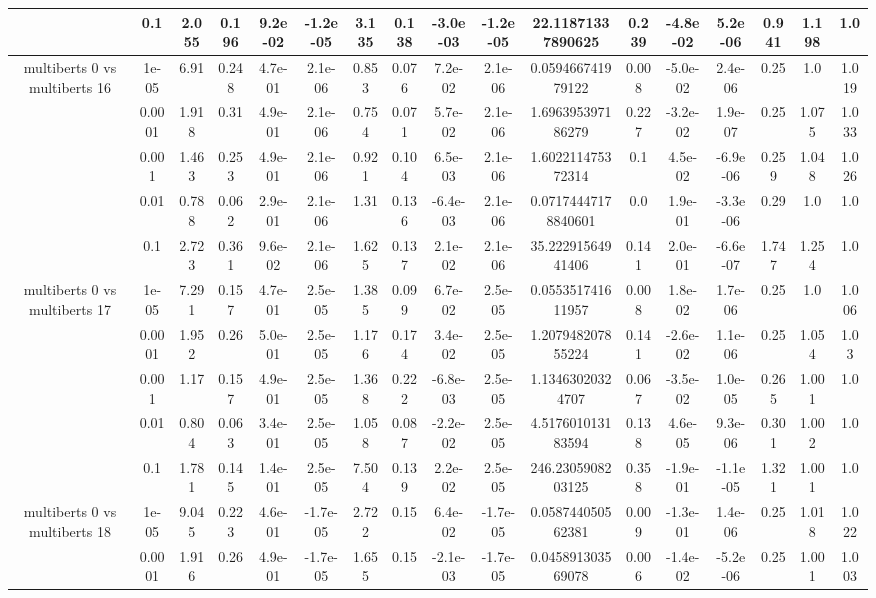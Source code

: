 \begin{tabular}{|c|c|c|c|c|c|c|c|c|c|c|c|c|c|c|c|c|}
 & 0.1 & 2.055 & 0.196 & 9.2e-02 & -1.2e-05 & 3.135 & 0.138 & -3.0e-03 & -1.2e-05 & 22.11871337890625 & 0.239 & -4.8e-02 & 5.2e-06 & 0.941 & 1.198 & 1.0 \\
\hline
\multirow{5}{*}{multiberts 0 vs multiberts 16} & 1e-05 & 6.91 & 0.248 & 4.7e-01 & 2.1e-06 & 0.853 & 0.076 & 7.2e-02 & 2.1e-06 & 0.059466741979122 & 0.008 & -5.0e-02 & 2.4e-06 & 0.25 & 1.0 & 1.019 \\
 & 0.0001 & 1.918 & 0.31 & 4.9e-01 & 2.1e-06 & 0.754 & 0.071 & 5.7e-02 & 2.1e-06 & 1.696395397186279 & 0.227 & -3.2e-02 & 1.9e-07 & 0.25 & 1.075 & 1.033 \\
 & 0.001 & 1.463 & 0.253 & 4.9e-01 & 2.1e-06 & 0.921 & 0.104 & 6.5e-03 & 2.1e-06 & 1.602211475372314 & 0.1 & 4.5e-02 & -6.9e-06 & 0.259 & 1.048 & 1.026 \\
 & 0.01 & 0.788 & 0.062 & 2.9e-01 & 2.1e-06 & 1.31 & 0.136 & -6.4e-03 & 2.1e-06 & 0.07174447178840601 & 0.0 & 1.9e-01 & -3.3e-06 & 0.29 & 1.0 & 1.0 \\
 & 0.1 & 2.723 & 0.361 & 9.6e-02 & 2.1e-06 & 1.625 & 0.137 & 2.1e-02 & 2.1e-06 & 35.22291564941406 & 0.141 & 2.0e-01 & -6.6e-07 & 1.747 & 1.254 & 1.0 \\
\hline
\multirow{5}{*}{multiberts 0 vs multiberts 17} & 1e-05 & 7.291 & 0.157 & 4.7e-01 & 2.5e-05 & 1.385 & 0.099 & 6.7e-02 & 2.5e-05 & 0.055351741611957 & 0.008 & 1.8e-02 & 1.7e-06 & 0.25 & 1.0 & 1.006 \\
 & 0.0001 & 1.952 & 0.26 & 5.0e-01 & 2.5e-05 & 1.176 & 0.174 & 3.4e-02 & 2.5e-05 & 1.207948207855224 & 0.141 & -2.6e-02 & 1.1e-06 & 0.25 & 1.054 & 1.03 \\
 & 0.001 & 1.17 & 0.157 & 4.9e-01 & 2.5e-05 & 1.368 & 0.222 & -6.8e-03 & 2.5e-05 & 1.13463020324707 & 0.067 & -3.5e-02 & 1.0e-05 & 0.265 & 1.001 & 1.0 \\
 & 0.01 & 0.804 & 0.063 & 3.4e-01 & 2.5e-05 & 1.058 & 0.087 & -2.2e-02 & 2.5e-05 & 4.517601013183594 & 0.138 & 4.6e-05 & 9.3e-06 & 0.301 & 1.002 & 1.0 \\
 & 0.1 & 1.781 & 0.145 & 1.4e-01 & 2.5e-05 & 7.504 & 0.139 & 2.2e-02 & 2.5e-05 & 246.2305908203125 & 0.358 & -1.9e-01 & -1.1e-05 & 1.321 & 1.001 & 1.0 \\
\hline
\multirow{5}{*}{multiberts 0 vs multiberts 18} & 1e-05 & 9.045 & 0.223 & 4.6e-01 & -1.7e-05 & 2.722 & 0.15 & 6.4e-02 & -1.7e-05 & 0.058744050562381 & 0.009 & -1.3e-01 & 1.4e-06 & 0.25 & 1.018 & 1.022 \\
 & 0.0001 & 1.916 & 0.26 & 4.9e-01 & -1.7e-05 & 1.655 & 0.15 & -2.1e-03 & -1.7e-05 & 0.045891303569078 & 0.006 & -1.4e-02 & -5.2e-06 & 0.25 & 1.001 & 1.003 \\

\end{tabular}
